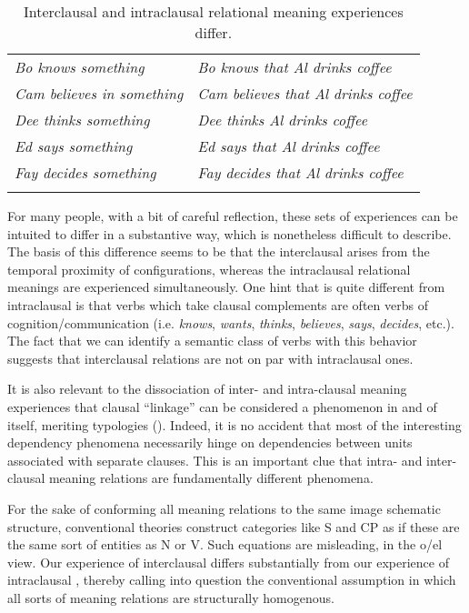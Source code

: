 \begin{table}
\begin{tabularx}{\textwidth}{XX}
\lsptoprule
\textit{Bo knows something} & \textit{Bo knows that Al drinks coffee}\\
\textit{Cam believes in something} & \textit{Cam believes that Al drinks coffee}\\
\textit{Dee thinks something}  & \textit{Dee thinks Al drinks coffee}\\
\textit{Ed says something} & \textit{Ed says that Al drinks coffee}\\
\textit{Fay decides something} & \textit{Fay decides that Al drinks coffee}\\
\lspbottomrule
\end{tabularx}
\caption{Interclausal and intraclausal relational meaning experiences differ.}\label{tab:5:1}
\end{table}
  For many people, with a bit of careful reflection, these sets of experiences can be intuited to differ in a substantive way, which is nonetheless difficult to describe. The basis of this difference seems to be that the interclausal  arises from the temporal proximity of configurations, whereas the intraclausal relational meanings are experienced simultaneously. One hint that  is quite different from intraclausal  is that verbs which take clausal complements are often verbs of cognition/communication (i.e. \textit{knows}, \textit{wants}, \textit{thinks}, \textit{believes}, \textit{says}, \textit{decides}, etc.). The fact that we can identify a semantic class of verbs with this behavior suggests that interclausal relations are not on par with intraclausal ones. 

  It is also relevant to the dissociation of inter- and intra-clausal meaning experiences that clausal “linkage” can be considered a phenomenon in and of itself, meriting typologies (\citealt{Bickel2010,Bril2010,Lehmann1988,VanValinJr1984}). Indeed, it is no accident that most of the interesting dependency phenomena necessarily hinge on dependencies between units associated with separate clauses. This is an important clue that intra- and inter-clausal meaning relations are fundamentally different phenomena.

  For the sake of conforming all meaning relations to the same image schematic structure, conventional theories construct categories like S and CP as if these are the same sort of entities as N or V. Such equations are misleading, in the o/el view. Our experience of interclausal  differs substantially from our experience of intraclausal , thereby calling into question the conventional assumption in which all sorts of meaning relations are structurally homogenous.

